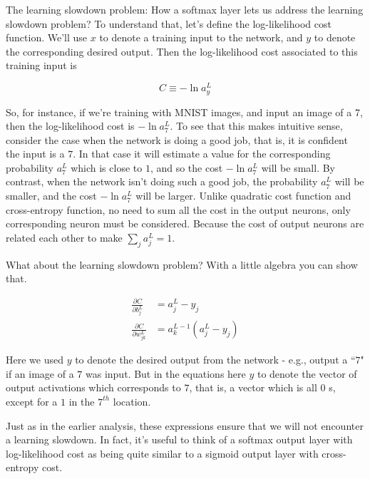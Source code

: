 \documentclass[12 pt]{article}
\begin{document}
The learning slowdown problem: How a softmax layer lets us address the
learning slowdown problem? To understand that, let's define the
log-likelihood cost function. We'll use $ x $ to denote a training
input to the network, and $ y $ to denote the corresponding desired
output. Then the log-likelihood cost associated to this training input
is

\begin{equation}
    C \equiv −\ln a^L_y
\end{equation}

So, for instance, if we're training with MNIST images, and input an
image of a 7, then the log-likelihood cost is $ −\ln a^L_7 $.
To see that this makes intuitive sense, consider the case when the network
is doing a good job, that is, it is confident the input is a $ 7 $.
In that case it will estimate a value for the corresponding probability
$ a^L_7 $ which is close to $ 1 $, and so the cost $ −\ln a^L_7 $ will be small.
By contrast, when the network isn't doing such a good
job, the probability $ a^L_7 $ will be smaller, and the cost
$ −\ln a^L_7 $ will be larger. Unlike quadratic cost function and
cross-entropy function, no need to sum all the cost in the output
neurons, only corresponding neuron must be considered. Because the cost
of output neurons are related each other to make $ \sum_j a^L_j = 1 $.

What about the learning slowdown problem? With a little algebra you can
show that.

\begin{equation}
    \begin{split}
        \frac{\partial C}{\partial b^L_j} & = a^L_j - y_j \\
        \frac{\partial C}{\partial w^L_{jk}} & = a^{L - 1}_k(a^L_j - y_j)
    \end{split}
\end{equation}

Here we used $ y $ to denote the desired output from the network -
e.g., output a ``$ 7 $" if an image of a $ 7 $ was input. But in the
equations here $ y $ to denote the vector of output activations which
corresponds to $ 7 $, that is, a vector which is all $ 0 $ s, except
for a $ 1 $ in the $ 7^{th} $ location.

Just as in the earlier analysis, these expressions ensure that we will
not encounter a learning slowdown. In fact, it's useful to think of a
softmax output layer with log-likelihood cost as being quite similar to
a sigmoid output layer with cross-entropy cost.
\end{document}
